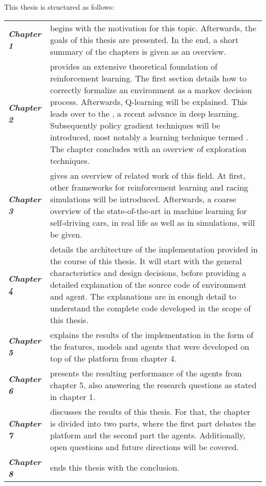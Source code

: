 This thesis is structured as follows:


\renewcommand{\arraystretch}{1.3}
\begin{flushleft}
\begin{tabular}{>{\em}p{2.2cm} p{\textwidth-3.2cm}} 
	\textbf{Chapter 1} & begins with the motivation for this topic. Afterwards, the goals of this thesis are presented. In the end, a short summary of the chapters is given as an overview.\\
	\textbf{Chapter 2} & provides an extensive theoretical foundation of reinforcement learning. The first section details how to correctly formalize an environment as a markov decision process. Afterwards, Q-learning will be explained. This leads over to the \keyword{Deep Q Network}, a recent advance in deep learning. Subsequently policy gradient techniques will be introduced, most notably a learning technique termed \keyword{Deep DPG}. The chapter concludes with an overview of exploration techniques.\\
	\textbf{Chapter 3} & gives an overview of related work of this field. At first, other frameworks for reinforcement learning and racing simulations will be introduced. Afterwards, a coarse overview of the state-of-the-art in machine learning for self-driving cars, in real life as well as in simulations, will be given.\\
	\textbf{Chapter 4} & details the architecture of the implementation provided in the course of this thesis. It will start with the general characteristics and design decisions, before providing a detailed explanation of the source code of environment and agent. The explanations are in enough detail to understand the complete code developed in the scope of this thesis.\\
	\textbf{Chapter 5} & explains the results of the implementation in the form of the features, models and agents that were developed on top of the platform from chapter 4.\\
	\textbf{Chapter 6} & presents the resulting performance of the agents from chapter 5, also answering the research questions as stated in chapter 1.\\
	\textbf{Chapter 7} & discusses the results of this thesis. For that, the chapter is divided into two parts, where the first part debates the platform and the second part the agents. Additionally, open questions and future directions will be covered.\\
	\textbf{Chapter 8} & ends this thesis with the conclusion.
\end{tabular}
\end{flushleft}